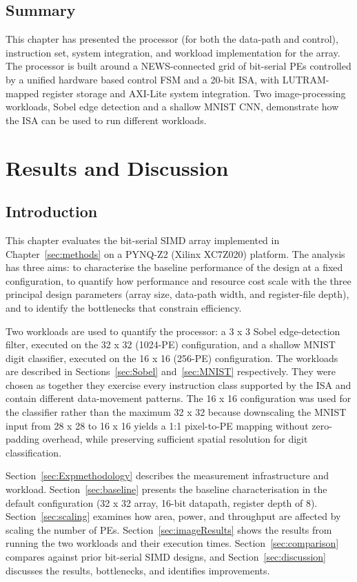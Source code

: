   \subsection{Summary}
    This chapter has presented the processor (for both the data-path and control), instruction set, system integration, and workload implementation for the array. The processor is built around a NEWS-connected grid of bit-serial PEs controlled by a unified hardware based control FSM and a 20-bit ISA, with LUTRAM-mapped register storage and AXI-Lite system integration. Two image-processing workloads, Sobel edge detection and a shallow MNIST CNN, demonstrate how the ISA can be used to run different workloads.
    
\section{Results and Discussion}    \label{sec:results}
    
    \subsection{Introduction}
    This chapter evaluates the bit-serial SIMD array implemented in Chapter~\ref{sec:methods} on a PYNQ-Z2 (Xilinx XC7Z020) platform. The analysis has three aims: to characterise the baseline performance of the design at a fixed configuration, to quantify how performance and resource cost scale with the three principal design parameters (array size, data-path width, and register-file depth), and to identify the bottlenecks that constrain efficiency.
    
    Two workloads are used to quantify the processor: a 3 x 3 Sobel edge-detection filter, executed on the 32 x 32 (1024-PE) configuration, and a shallow MNIST digit classifier, executed on the 16 x 16 (256-PE) configuration. The workloads are described in Sections~\ref{sec:Sobel} and~\ref{sec:MNIST} respectively. They were chosen as together they exercise every instruction class supported by the ISA and contain different data-movement patterns. The 16 x 16 configuration was used for the classifier rather than the maximum 32 x 32 because downscaling the MNIST input from 28 x 28 to 16 x 16 yields a 1:1 pixel-to-PE mapping without zero-padding overhead, while preserving sufficient spatial resolution for digit classification.
    
    Section~\ref{sec:Expmethodology} describes the measurement infrastructure and workload. Section~\ref{sec:baseline} presents the baseline characterisation in the default configuration (32 x 32 array, 16-bit datapath, register depth of 8). Section~\ref{sec:scaling} examines how area, power, and throughput are affected by scaling the number of PEs. Section~\ref{sec:imageResults} shows the results from running the two workloads and their execution times. Section~\ref{sec:comparison} compares against prior bit-serial SIMD designs, and Section~\ref{sec:discussion} discusses the results, bottlenecks, and identifies improvements.
